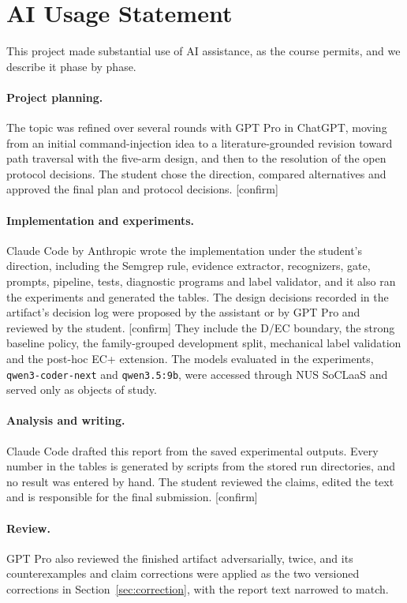 \section*{AI Usage Statement}

This project made substantial use of AI assistance, as the course permits, and we describe it phase by phase. %

\paragraph{Project planning.}
The topic was refined over several rounds with GPT Pro in ChatGPT, moving from an initial command-injection idea to a literature-grounded revision toward path traversal with the five-arm design, and then to the resolution of the open protocol decisions. The student chose the direction, compared alternatives and approved the final plan and protocol decisions. [confirm]

\paragraph{Implementation and experiments.}
Claude Code by Anthropic wrote the implementation under the student's direction, including the Semgrep rule, evidence extractor, recognizers, gate, prompts, pipeline, tests, diagnostic programs and label validator, and it also ran the experiments and generated the tables. The design decisions recorded in the artifact's decision log were proposed by the assistant or by GPT Pro and reviewed by the student. [confirm] They include the D/EC boundary, the strong baseline policy, the family-grouped development split, mechanical label validation and the post-hoc EC+ extension. The models evaluated in the experiments, \texttt{qwen3-coder-next} and \texttt{qwen3.5:9b}, were accessed through NUS SoCLaaS and served only as objects of study.

\paragraph{Analysis and writing.}
Claude Code drafted this report from the saved experimental outputs. Every number in the tables is generated by scripts from the stored run directories, and no result was entered by hand. The student reviewed the claims, edited the text and is responsible for the final submission. [confirm]

\paragraph{Review.}
GPT Pro also reviewed the finished artifact adversarially, twice, and its counterexamples and claim corrections were applied as the two versioned corrections in Section~\ref{sec:correction}, with the report text narrowed to match.


